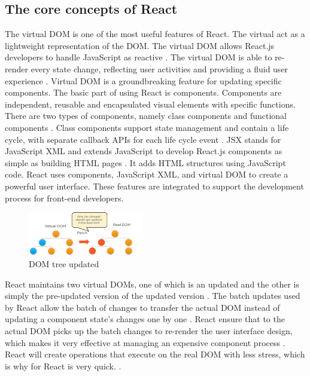 \documentclass[10pt,journal,compsoc]{IEEEtran}
\begin{document}
\subsection{The core concepts of React}

The virtual DOM is one of the most useful features of React. The virtual act as a lightweight representation of the DOM. The virtual DOM allows React.js developers to handle JavaScript as reactive \cite{dinku2022react}. The virtual DOM is able to  re-render every state change, reflecting user activities and providing a fluid user experience \cite{dinku2022react}. Virtual DOM is a groundbreaking feature for updating specific components. The basic part of using React is components. Components are independent, reusable and encapsulated visual elements with specific functions. There are two types of components, namely class components and functional components \cite{lazuardy2022modern}. Class components support state management and contain a life cycle, with separate callback APIs for each life cycle event \cite{dinku2022react}. JSX stands for JavaScript XML and extends JavaScript to develop React.js components as simple as building HTML pages \cite{dinku2022react}. It adds HTML structures using JavaScript code. React uses components, JavaScript XML, and virtual DOM to create a powerful user interface. These features are integrated to support the development process for front-end developers.
\begin{figure}[ht]
    \centering
    \includegraphics[width=0.45\textwidth]{V-RDOM.jpg}
    \caption{DOM tree updated \cite{vyas2022comparative}}
    \label{fig:dom}
\end{figure}React maintains two virtual DOMs, one of which is an updated and the other is simply the pre-updated version of the updated version \cite{vyas2022comparative}. The batch updates used by React allow the batch of changes to transfer the actual DOM instead of updating a component state's changes one by one \cite{vyas2022comparative}. React ensure that to the actual DOM picks up the batch changes to re-render the user interface design, which makes it very effective at managing an expensive component process \cite{vyas2022comparative}. React will create operations that execute on the real DOM with less stress, which is why for React is very quick. \cite{wohlgethan2018supportingweb}.
\end{document}
